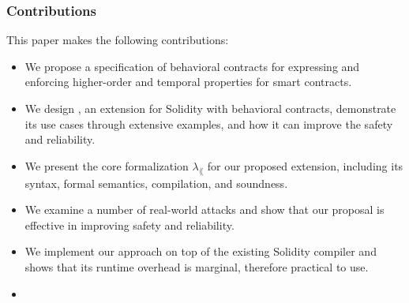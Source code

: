 


\subsubsection*{\textbf{Contributions}} This paper makes the following contributions:
\begin{itemize}
	\item We propose a specification of behavioral contracts for expressing and
	      enforcing higher-order and temporal properties for smart contracts.
	\item We design \lang, an extension for Solidity with
	      behavioral contracts, demonstrate its use cases through extensive examples,
	      and how it can improve the safety and reliability.
	\item We present the core formalization $\lambda_\lang$ for our proposed
	      extension, including its syntax, formal semantics, compilation, and
	      soundness.
	\item We examine a number of real-world attacks and show that our proposal is
	      effective in improving safety and reliability.
	\item We implement our approach on top of the existing Solidity compiler and shows
	      that its runtime overhead is marginal, therefore practical to use.
	\item {}
\end{itemize}

